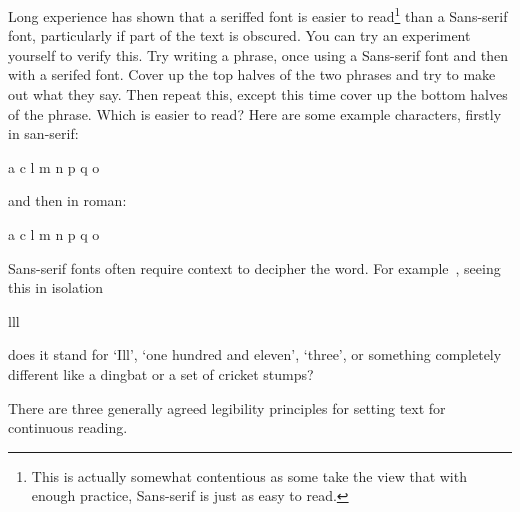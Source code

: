 \documentclass[10pt,letterpaper,extrafontsizes]{memoir}
\begin{document}
Long experience has shown that a seriffed font is easier to 
read\footnote{This is actually somewhat contentious as some take the view
that with enough practice, Sans-serif is just as easy to read.}
than a
Sans-serif font, particularly if part of the text is obscured. You can
try an experiment yourself to verify this. Try writing a phrase, once
using a Sans-serif font and then with a serifed font. Cover up
the top halves of the two phrases and try to make out what they say. Then
repeat this, except this time cover up the bottom halves of the phrase.
Which is easier to read? Here are some example characters, firstly in san-serif:
\begin{center}
{\Huge\sffamily a c l m n p q o}
\end{center}
and then in roman:
\begin{center}
{\Huge a c l m n p q o}
\end{center}

    Sans-serif fonts often require context to decipher the word. 
For example~\autocite{MCLEAN80},
seeing this in isolation
\begin{center}
{\Huge\sffamily lll}
\end{center}
does it stand for `Ill', `one hundred and eleven', `three', or something
completely different like a dingbat or a set of cricket stumps?

    
    There are three generally agreed legibility 
principles for setting text for
continuous reading.
\end{document}
